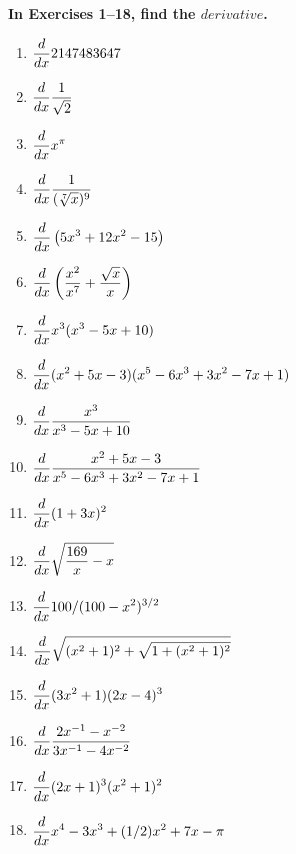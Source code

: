 \begin{exercise}
    ~\\\\\-\hspace{0.3cm} \textbf{
        In Exercises 1–18, find the $derivative$.
    }\cite{mooc}
    \twocol
    \begin{enumerate} 
        \item $\displaystyle\frac{d}{dx} 2147483647$
        \item $\displaystyle\frac{d}{dx} \frac{1}{\sqrt{2}}$
        
        \item $\displaystyle\frac{d}{dx} x^\pi$
        \item $\displaystyle\frac{d}{dx} \frac{1}{(\sqrt[7]{x})^9}$
        
        \item $\displaystyle\frac{d}{dx} \left(5x^3+12x^2-15\right)$
        \item $\displaystyle\frac{d}{dx} \left(\frac{x^2}{x^7}+\frac{\sqrt{x}}{x}\right)$
        
        \item $\displaystyle\frac{d}{dx} x^3(x^3-5x+10)$
        \item $\displaystyle\frac{d}{dx} (x^2+5x-3)(x^5-6x^3+3x^2-7x+1)$
        
		\item $\displaystyle \displaystyle\frac{d}{dx} {x^3\over x^3-5x+10}$
		\item $\displaystyle \displaystyle\frac{d}{dx} {x^2+5x-3\over x^5-6x^3+3x^2-7x+1}$

		\item $\displaystyle \displaystyle\frac{d}{dx} (1+3x)^2$
		\item $\displaystyle \displaystyle\frac{d}{dx} \sqrt{{169\over x}-x}$
		\item $\displaystyle \displaystyle\frac{d}{dx} 100/(100-x^2)^{3/2}$
		\item $\displaystyle \displaystyle\frac{d}{dx} \sqrt{(x^2+1)^2+\sqrt{1+(x^2+1)^2}}$
		\item $\displaystyle \displaystyle\frac{d}{dx} (3x^2+1)(2x-4)^3$
		\item $\displaystyle \displaystyle\frac{d}{dx} {2x^{-1}-x^{-2}\over 3x^{-1}-4x^{-2}}$
		\item $\displaystyle \displaystyle\frac{d}{dx} (2x+1)^3(x^2+1)^2$
		\item $\displaystyle \displaystyle\frac{d}{dx} x^4-3x^3+(1/2)x^2+7x-\pi$
    \end{enumerate}
    \endtwocol
\end{exercise}
